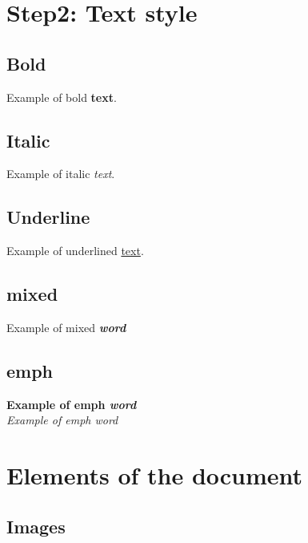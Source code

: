 \documentclass[a4paper, oneside]{book}
\begin{document}


\tableofcontents
\listoffigures
\listoftables
\printglossary
\clearpage

\setcounter{page}{1}
 



 
\chapter{Step2: Text style}
\section{Bold}
Example of bold \textbf{text}.
\section{Italic}
Example of italic \textit{text}.
\section{Underline}
Example of underlined \underline{text}.
\section{mixed}
Example of mixed \textbf{\textit{word}}
\section{emph}
\textbf{Example of emph \emph{word}}\\
\textit{Example of emph \emph{word}}

\chapter{Elements of the document}
\section{Images}
\end{document}
